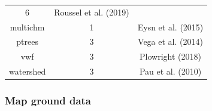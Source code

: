 \documentclass[]{article}
\begin{document}
\begin{longtable}[]{@{}ccc@{}}
\begin{minipage}[t]{0.22\columnwidth}
6\strut
\end{minipage} & \begin{minipage}[t]{0.34\columnwidth}\centering\strut
Roussel et al. (2019)\strut
\end{minipage}\tabularnewline
\begin{minipage}[t]{0.18\columnwidth}\centering\strut
multichm\strut
\end{minipage} & \begin{minipage}[t]{0.22\columnwidth}\centering\strut
1\strut
\end{minipage} & \begin{minipage}[t]{0.34\columnwidth}\centering\strut
Eysn et al. (2015)\strut
\end{minipage}\tabularnewline
\begin{minipage}[t]{0.18\columnwidth}\centering\strut
ptrees\strut
\end{minipage} & \begin{minipage}[t]{0.22\columnwidth}\centering\strut
3\strut
\end{minipage} & \begin{minipage}[t]{0.34\columnwidth}\centering\strut
Vega et al. (2014)\strut
\end{minipage}\tabularnewline
\begin{minipage}[t]{0.18\columnwidth}\centering\strut
vwf\strut
\end{minipage} & \begin{minipage}[t]{0.22\columnwidth}\centering\strut
3\strut
\end{minipage} & \begin{minipage}[t]{0.34\columnwidth}\centering\strut
Plowright (2018)\strut
\end{minipage}\tabularnewline
\begin{minipage}[t]{0.18\columnwidth}\centering\strut
watershed\strut
\end{minipage} & \begin{minipage}[t]{0.22\columnwidth}\centering\strut
3\strut
\end{minipage} & \begin{minipage}[t]{0.34\columnwidth}\centering\strut
Pau et al. (2010)\strut
\end{minipage}\tabularnewline
\bottomrule
\end{longtable}

\subsubsection{Map ground data}\label{map-ground-data}
\end{document}
